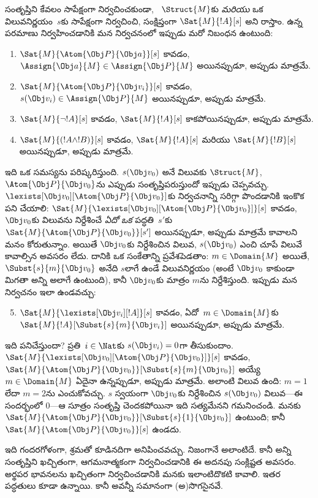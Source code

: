 \documentclass[../../../include/open-logic-section]{subfiles}
\begin{document}
 సంతృప్తిని కేవలం  సాపేక్షంగా
నిర్వచించకుండా, ~$\Struct{M}$కు \emph{మరియు}
ఒక  విలువనిర్ణయం~$s$కు సాపేక్షంగా నిర్వచించి, సంక్షిప్తంగా
$\Sat{M}{!A}[s]$ అని రాస్తాం.  ఉన్న పరమాణు
 నిర్వహించడానికి మన నిర్వచనంలో ఇప్పుడు మరో నిబంధన
ఉంటుంది:
\begin{enumerate}
  \item $\Sat{M}{\Atom{\Obj P}{\Obj a}}[s]$ కావడం,
  $\Assign{\Obj a}{M} \in \Assign{\Obj P}{M}$ అయినప్పుడూ, అప్పుడు
  మాత్రమే.
  \item $\Sat{M}{\Atom{\Obj P}{\Obj v_i}}[s]$ కావడం,
  $s(\Obj v_i) \in \Assign{\Obj P}{M}$ అయినప్పుడూ, అప్పుడు మాత్రమే.
  \item $\Sat{M}{\lnot !A}[s]$ కావడం, $\Sat{M}{!A}[s]$ కాకపోయినప్పుడూ,
  అప్పుడు మాత్రమే.
  \item $\Sat{M}{(!A \land !B)}[s]$ కావడం, $\Sat{M}{!A}[s]$ మరియు
  $\Sat{M}{!B}[s]$ అయినప్పుడూ, అప్పుడు మాత్రమే.
\end{enumerate}
ఇది ఒక సమస్యను పరిష్కరిస్తుంది. $s(\Obj v_0)$ అనే విలువకు
$\Struct{M}$, $\Atom{\Obj P}{\Obj v_0}$ను ఎప్పుడు సంతృప్తిపరుస్తుందో
ఇప్పుడు చెప్పవచ్చు. $\lexists[\Obj v_0][\Atom{\Obj P}{\Obj v_0}]$కు
నిర్వచనాన్ని సరిగ్గా పొందడానికి ఇంకొక పని చేయాలి:
$\Sat{M}{\lexists[\Obj v_0][\Atom{\Obj P}{\Obj v_0}]}[s]$ కావడం,
$\Obj v_0$కు విలువను నిర్దేశించే \emph{ఏదో ఒక} పద్ధతి~$s'$కు
$\Sat{M}{\Atom{\Obj P}{\Obj v_0}}[s']$ అయినప్పుడూ, అప్పుడు మాత్రమే
కావాలని మనం కోరుతున్నాం. అయితే $\Obj v_0$కు నిర్దేశించిన విలువ,
$s(\Obj v_0)$ ఎంచి చూపే విలువే కావాల్సిన అవసరం లేదు. దానికి ఒక
సంకేతాన్ని ప్రవేశపెడతాం: $m \in \Domain{M}$ అయితే,
$\Subst{s}{m}{\Obj v_0}$ అనేది $s$లాగే ఉండే విలువనిర్ణయం (అంటే $\Obj
v_0$ కాకుండా మిగతా అన్ని  అలాగే ఉంటుంది), కానీ
$\Obj v_0$కు మాత్రం $m$ను నిర్దేశిస్తుంది. ఇప్పుడు మన నిర్వచనం ఇలా
ఉండవచ్చు:
\begin{enumerate}\setcounter{enumi}{4}
  \item $\Sat{M}{\lexists[\Obj v_i][!A]}[s]$ కావడం,
  ఏదో~$m \in \Domain{M}$కు $\Sat{M}{!A}[\Subst{s}{m}{\Obj v_i}]$
  అయినప్పుడూ, అప్పుడు మాత్రమే.
\end{enumerate}
ఇది పనిచేస్తుందా? ప్రతి~$i \in \Nat$కు $s(\Obj v_i) = 0$గా
తీసుకుందాం. $\Sat{M}{\lexists[\Obj v_0][\Atom{\Obj P}{\Obj
v_0}]}[s]$ కావడం, $\Sat{M}{\Atom{\Obj P}{\Obj
v_0}}[\Subst{s}{m}{\Obj v_0}]$ అయ్యే $m \in \Domain{M}$ ఏదైనా
ఉన్నప్పుడూ, అప్పుడు మాత్రమే. అలాంటి విలువ ఉంది: $m = 1$ లేదా $m = 2$ను
ఎంచుకోవచ్చు. $s$ స్వయంగా $\Obj v_0$కు నిర్దేశించిన
$s(\Obj v_0)$ విలువ---ఈ సందర్భంలో $0$---ఆ సూత్రం సంతృప్తి చెందకపోయినా ఇది
సత్యమేనని గమనించండి. మనకు $\Sat{M}{\Atom{\Obj P}{\Obj
v_0}}[\Subst{s}{1}{\Obj v_0}]$ ఉంటుంది; కానీ
$\Sat{M}{\Atom{\Obj P}{\Obj v_0}}[s]$ ఉండదు.

ఇది గందరగోళంగా, శ్రమతో కూడినదిగా అనిపించవచ్చు. నిజంగానే అలాంటిదే. కానీ అన్ని
 సంతృప్తిని ఖచ్చితంగా, ఆగమనాత్మకంగా నిర్వచించడానికి ఈ
అదనపు సంక్లిష్టత అవసరం. అర్థపర భావనలను ఖచ్చితంగా నిర్వచించడానికి
మనకు ఇలాంటిదొకటి కావాలి. ఇతర పద్ధతులు కూడా ఉన్నాయి. కానీ అవన్నీ
సమానంగా (అ)సొగసైనవే.
\end{document}
